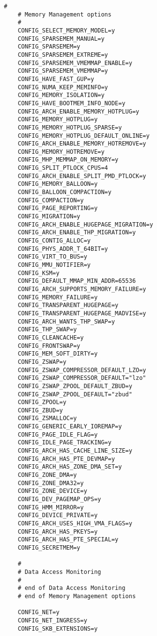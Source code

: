 \begin{multicols}{2}
\begin{lstlisting}[caption=kernel config,label=kconfig,]
    #
    # Memory Management options
    #
    CONFIG_SELECT_MEMORY_MODEL=y
    CONFIG_SPARSEMEM_MANUAL=y
    CONFIG_SPARSEMEM=y
    CONFIG_SPARSEMEM_EXTREME=y
    CONFIG_SPARSEMEM_VMEMMAP_ENABLE=y
    CONFIG_SPARSEMEM_VMEMMAP=y
    CONFIG_HAVE_FAST_GUP=y
    CONFIG_NUMA_KEEP_MEMINFO=y
    CONFIG_MEMORY_ISOLATION=y
    CONFIG_HAVE_BOOTMEM_INFO_NODE=y
    CONFIG_ARCH_ENABLE_MEMORY_HOTPLUG=y
    CONFIG_MEMORY_HOTPLUG=y
    CONFIG_MEMORY_HOTPLUG_SPARSE=y
    CONFIG_MEMORY_HOTPLUG_DEFAULT_ONLINE=y
    CONFIG_ARCH_ENABLE_MEMORY_HOTREMOVE=y
    CONFIG_MEMORY_HOTREMOVE=y
    CONFIG_MHP_MEMMAP_ON_MEMORY=y
    CONFIG_SPLIT_PTLOCK_CPUS=4
    CONFIG_ARCH_ENABLE_SPLIT_PMD_PTLOCK=y
    CONFIG_MEMORY_BALLOON=y
    CONFIG_BALLOON_COMPACTION=y
    CONFIG_COMPACTION=y
    CONFIG_PAGE_REPORTING=y
    CONFIG_MIGRATION=y
    CONFIG_ARCH_ENABLE_HUGEPAGE_MIGRATION=y
    CONFIG_ARCH_ENABLE_THP_MIGRATION=y
    CONFIG_CONTIG_ALLOC=y
    CONFIG_PHYS_ADDR_T_64BIT=y
    CONFIG_VIRT_TO_BUS=y
    CONFIG_MMU_NOTIFIER=y
    CONFIG_KSM=y
    CONFIG_DEFAULT_MMAP_MIN_ADDR=65536
    CONFIG_ARCH_SUPPORTS_MEMORY_FAILURE=y
    CONFIG_MEMORY_FAILURE=y
    CONFIG_TRANSPARENT_HUGEPAGE=y
    CONFIG_TRANSPARENT_HUGEPAGE_MADVISE=y
    CONFIG_ARCH_WANTS_THP_SWAP=y
    CONFIG_THP_SWAP=y
    CONFIG_CLEANCACHE=y
    CONFIG_FRONTSWAP=y
    CONFIG_MEM_SOFT_DIRTY=y
    CONFIG_ZSWAP=y
    CONFIG_ZSWAP_COMPRESSOR_DEFAULT_LZO=y
    CONFIG_ZSWAP_COMPRESSOR_DEFAULT="lzo"
    CONFIG_ZSWAP_ZPOOL_DEFAULT_ZBUD=y
    CONFIG_ZSWAP_ZPOOL_DEFAULT="zbud"
    CONFIG_ZPOOL=y
    CONFIG_ZBUD=y
    CONFIG_ZSMALLOC=y
    CONFIG_GENERIC_EARLY_IOREMAP=y
    CONFIG_PAGE_IDLE_FLAG=y
    CONFIG_IDLE_PAGE_TRACKING=y
    CONFIG_ARCH_HAS_CACHE_LINE_SIZE=y
    CONFIG_ARCH_HAS_PTE_DEVMAP=y
    CONFIG_ARCH_HAS_ZONE_DMA_SET=y
    CONFIG_ZONE_DMA=y
    CONFIG_ZONE_DMA32=y
    CONFIG_ZONE_DEVICE=y
    CONFIG_DEV_PAGEMAP_OPS=y
    CONFIG_HMM_MIRROR=y
    CONFIG_DEVICE_PRIVATE=y
    CONFIG_ARCH_USES_HIGH_VMA_FLAGS=y
    CONFIG_ARCH_HAS_PKEYS=y
    CONFIG_ARCH_HAS_PTE_SPECIAL=y
    CONFIG_SECRETMEM=y
    
    #
    # Data Access Monitoring
    #
    # end of Data Access Monitoring
    # end of Memory Management options
    
    CONFIG_NET=y
    CONFIG_NET_INGRESS=y
    CONFIG_SKB_EXTENSIONS=y
    

\end{lstlisting}
\end{multicols}
